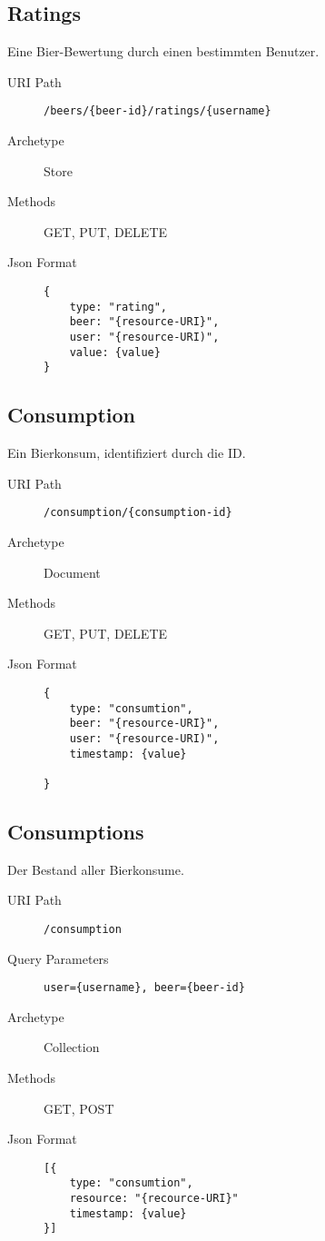 \documentclass[10pt,a4paper]{scrartcl}
\begin{document}
\subsection{Ratings}

Eine Bier-Bewertung durch einen bestimmten Benutzer.

\begin{description}
	\item[URI Path] \texttt{/beers/\{beer-id\}/ratings/\{username\}}
	\item[Archetype] Store
	\item[Methods] GET, PUT, DELETE
	\item[Json Format] \hfill
\begin{lstlisting}
{
	type: "rating",
	beer: "{resource-URI}",
	user: "{resource-URI)",
	value: {value}
}
	\end{lstlisting}
\end{description}


\subsection{Consumption}

Ein Bierkonsum, identifiziert durch die ID.

\begin{description}
	\item[URI Path] \texttt{/consumption/\{consumption-id\}}
	\item[Archetype] Document
	\item[Methods] GET, PUT, DELETE
	\item[Json Format] \hfill
\begin{lstlisting}
{
	type: "consumtion",
	beer: "{resource-URI}",
	user: "{resource-URI)",
	timestamp: {value}
	
}
\end{lstlisting}
\end{description}


\subsection{Consumptions}

Der Bestand aller Bierkonsume.

\begin{description}
 	\item[URI Path] \texttt{/consumption}
 	\item[Query Parameters] \texttt{user=\{username\}, beer=\{beer-id\}}
	\item[Archetype] Collection
	\item[Methods] GET, POST
	\item[Json Format] \hfill
\begin{lstlisting}
[{	
	type: "consumtion",
	resource: "{recource-URI}"
	timestamp: {value}
}]
\end{lstlisting}
\end{description}
\end{document}
